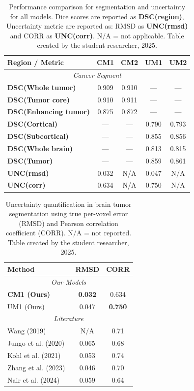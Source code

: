 \documentclass[11pt,letterpaper]{article}
\begin{document}
\begin{table}[htbp]
\centering
\caption{Performance comparison for segmentation and uncertainty for all models. Dice scores are reported as \textbf{DSC(region)}, Uncertainty metric are reported as: RMSD as \textbf{UNC(rmsd)} and CORR as \textbf{UNC(corr)}. N/A = not applicable. Table created by the student researcher, 2025.}
\label{tab:combined_results_reordered}
\begin{tabular}{lcc|cc}
\toprule
\textbf{Region / Metric} & \textbf{CM1} & \textbf{CM2} & \textbf{UM1} & \textbf{UM2} \\
\midrule
\multicolumn{5}{c}{\textit{Cancer Segment}} \\
\midrule
\textbf{DSC(Whole tumor)} & 0.909 & 0.910 & — & — \\
\textbf{DSC(Tumor core)} & 0.910 & 0.911 & — & — \\
\textbf{DSC(Enhancing tumor)} & 0.875 & 0.872 & — & — \\
\midrule
\textbf{DSC(Cortical)} & — & — & 0.790 & 0.793 \\
\textbf{DSC(Subcortical)} & — & — & 0.855 & 0.856 \\
\textbf{DSC(Whole brain)} & — & — & 0.813 & 0.815 \\
\textbf{DSC(Tumor)} & — & — & 0.859 & 0.861 \\
\midrule
\textbf{UNC(rmsd)} & 0.032 & N/A & 0.047 & N/A \\
\textbf{UNC(corr)} & 0.634 & N/A & 0.750 & N/A \\
\bottomrule
\end{tabular}
\end{table}

\begin{table}[htbp]
\centering
\caption{Uncertainty quantification in brain tumor segmentation using true per-voxel error (RMSD) and Pearson correlation coefficient (CORR). N/A = not reported. Table created by the student researcher, 2025.}
\label{tab:uq_corrected}
\begin{tabular}{l cc}
\toprule
\textbf{Method} & \textbf{RMSD} & \textbf{CORR} \\
\midrule
\multicolumn{3}{c}{\textit{Our Models}} \\
\midrule
\textbf{CM1 (Ours)} & \textbf{0.032} & 0.634 \\
UM1 (Ours) & 0.047 & \textbf{0.750} \\
\midrule
\multicolumn{3}{c}{\textit{Literature}} \\
\midrule
Wang (2019)~\cite{wang2019aleatoric} & N/A & 0.71 \\
Jungo et al. (2020)~\cite{jungo2020analyzing} & 0.065 & 0.68 \\
Kohl et al. (2021)~\cite{savadikar2021} & 0.053 & 0.74 \\
Zhang et al. (2023)~\cite{zhang2023} & 0.046 & 0.70 \\
Nair et al. (2024)~\cite{mehta2024} & 0.059 & 0.64 \\
\bottomrule
\end{tabular}
\end{table}
\end{document}
